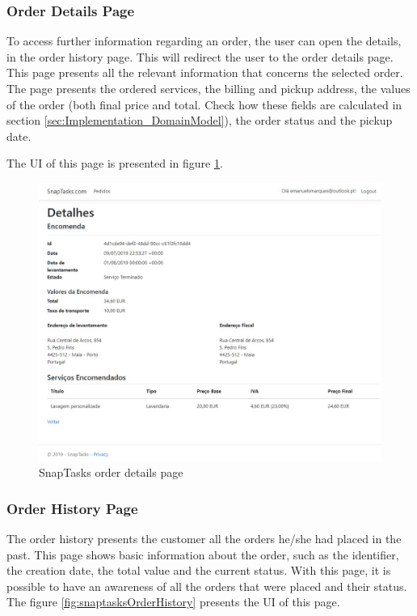 \subsubsection{Order Details Page}
To access further information regarding an order, the user can open the details, in the order history page. This will redirect the user to the order details page. This page presents all the relevant information that concerns the selected order. The page presents the ordered services, the billing and pickup address, the values of the order (both final price and total. Check how these fields are calculated in section \ref{sec:Implementation_DomainModel}), the order status and the pickup date.

\par

The \gls{UI} of this page is presented in figure \ref{fig:snaptasksOrderDetails}.

\begin{figure}[ht]
\centering
\includegraphics[width=\textwidth,keepaspectratio]{chapters/Implementation/assets/snaptasks-orderDetails.jpg}
\caption[SnapTasks order details page]{SnapTasks order details page}
\label{fig:snaptasksOrderDetails}
\end{figure}


\clearpage
\subsubsection{Order History Page}
The order history presents the customer all the orders he/she had placed in the past. This page shows basic information about the order, such as the identifier, the creation date, the total value and the current status. With this page, it is possible to have an awareness of all the orders that were placed and their status. The figure \ref{fig:snaptasksOrderHistory} presents the \gls{UI} of this page.


